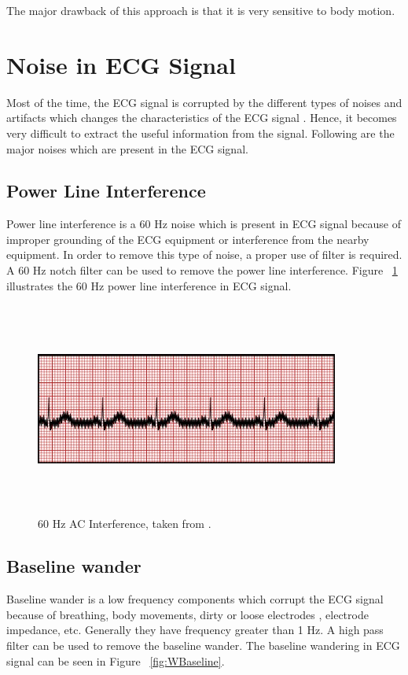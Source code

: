 The major drawback of this approach is that it is very sensitive to body motion.

\section{Noise in ECG Signal}
Most of the time, the ECG signal is corrupted by the different types of noises and artifacts which changes the characteristics of the ECG signal \cite{limaye2016ecg}. Hence, it becomes very difficult to extract the useful information from the signal. Following are the major noises which are present in the ECG signal.

\subsection{Power Line Interference}
Power line interference is a 60 Hz noise which is present in ECG signal because of improper grounding of the ECG equipment or interference from the nearby equipment. In order to remove this type of noise, a proper use of filter is required. A 60 Hz notch filter can be used to remove the power line interference. Figure ~\ref{fig:ACInterference} illustrates the 60 Hz power line interference in ECG signal.

\begin{figure}[htpb]
	\centering
	\includegraphics[width=10cm,height=7cm,keepaspectratio=true]{images/ACInterference}
	\caption{
		60 Hz AC Interference, taken from \cite{ecg_artifacts}.
	}
	\label{fig:ACInterference}
\end{figure}

\subsection{Baseline wander}
Baseline wander is a low frequency components which corrupt the ECG signal because of breathing, body movements, dirty or loose electrodes , electrode impedance, etc. Generally they have frequency greater than 1 Hz. A high pass filter can be used to remove the baseline wander. The baseline wandering in ECG signal can be seen in Figure ~\ref{fig:WBaseline}.

